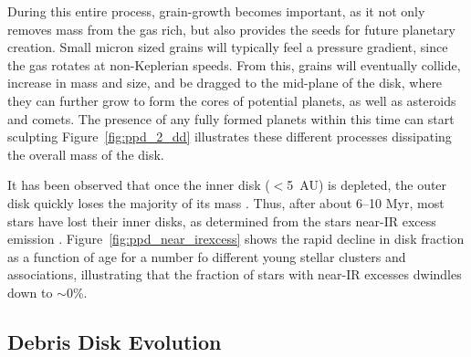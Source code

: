     During this entire process, grain-growth becomes important, as it not only removes mass from the gas rich, but also provides the seeds for future planetary creation. Small micron sized grains will typically feel a pressure gradient, since the gas rotates at non-Keplerian speeds. From this, grains will eventually collide, increase in mass and size, and be dragged to the mid-plane of the disk, where they can further grow to form the cores of potential planets, as well as asteroids and comets. The presence of any fully formed planets within this time can start sculpting  Figure~\ref{fig:ppd_2_dd} illustrates these different processes dissipating the overall mass of the disk.
    
    
    It has been observed that once the inner disk ($<$5~AU) is depleted, the outer disk quickly loses the majority of its mass \citep{Williams2011}. Thus, after about 6--10 Myr, most stars have lost their inner disks, as determined from the stars near-IR excess emission \citep{Wyatt2008}. Figure~\ref{fig:ppd_near_irexcess} shows the rapid decline in disk fraction as a function of age for a number fo different young stellar clusters and associations, illustrating that the fraction of stars with near-IR excesses dwindles down to $\sim$0\%. 
    
    
        
    \subsection{Debris Disk Evolution}\label{sec:debrisdisk_phase}
    

